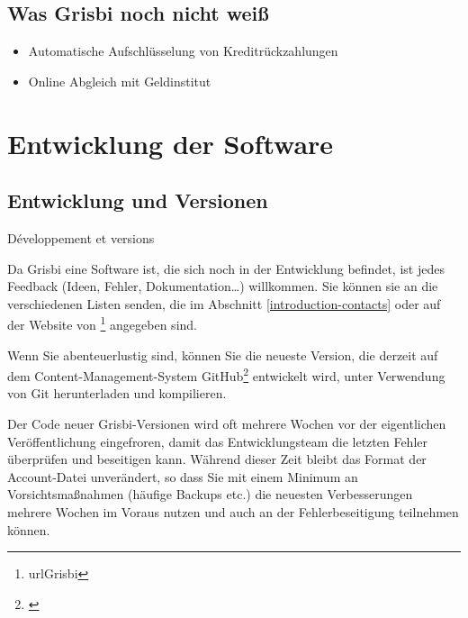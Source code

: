 \subsection{Was Grisbi noch nicht weiß}%

\begin{itemize}
	\item Automatische Aufschlüsselung von Kreditrückzahlungen%
	\item Online Abgleich mit Geldinstitut%
\end{itemize}


\section{Entwicklung der Software}%


\subsection{Entwicklung und Versionen}Développement et versions

Da Grisbi eine Software ist, die sich noch in der Entwicklung befindet, ist jedes Feedback (Ideen, Fehler, Dokumentation\dots{}) willkommen. Sie können sie an die verschiedenen Listen senden, die im Abschnitt \vref{introduction-contacts}  oder auf der Website von \footnote{urlGrisbi{}} angegeben sind.

Wenn Sie abenteuerlustig sind, können Sie die neueste Version, die derzeit auf dem Content-Management-System \gls{GitHub}\footnote{\urlGitHubGrisbi{}\label{siteGitHubGrisbi}} entwickelt wird, unter Verwendung von \gls{Git} herunterladen und kompilieren.

Der Code neuer Grisbi-Versionen wird oft mehrere Wochen vor der eigentlichen Veröffentlichung eingefroren, damit das Entwicklungsteam die letzten Fehler überprüfen und beseitigen kann. Während dieser Zeit bleibt das Format der Account-Datei unverändert, so dass Sie mit einem Minimum an Vorsichtsmaßnahmen (häufige Backups etc.) die neuesten Verbesserungen mehrere Wochen im Voraus nutzen und auch an der Fehlerbeseitigung teilnehmen können.

